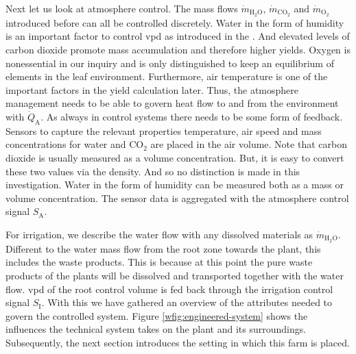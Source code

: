 Next let us look at atmosphere control.
The mass flows $\dot{m}_{\text{H}_2\text{O}}$, $\dot{m}_{\text{CO}_2}$ and $\dot{m}_{\text{O}_2}$ introduced before can all be controlled discretely.
Water in the form of humidity is an important factor to control \ac{vpd} as introduced in the .
And elevated levels of carbon dioxide promote mass accumulation and therefore higher yields.
Oxygen is nonessential in our inquiry and is only distinguished to keep an equilibrium of elements in the leaf environment.
Furthermore, air temperature is one of the important factors in the yield calculation later.
Thus, the atmosphere management needs to be able to govern heat flow to and from the environment with $\dot{Q}_\text{A}$.
As always in control systems there needs to be some form of feedback.
Sensors to capture the relevant properties temperature, air speed and mass concentrations for water and CO$_2$ are placed in the air volume.
Note that carbon dioxide is usually measured as a volume concentration.
But, it is easy to convert these two values via the density.
And so no distinction is made in this investigation.
Water in the form of humidity can be measured both as a mass or volume concentration.
The sensor data is aggregated with the atmosphere control signal $S_\text{A}$.

For irrigation, we describe the water flow with any dissolved materials as $\dot{m}_{\text{H}_2\text{O}}$.
Different to the water mass flow from the root zone towards the plant, this includes the waste products.
This is because at this point the pure waste products of the plants will be dissolved and transported together with the water flow.
\ac{vpd} of the root control volume is fed back through the irrigation control signal $S_\text{I}$.
With this we have gathered an overview of the attributes needed to govern the controlled system.
Figure \ref{wfig:engineered-system} shows the influences the technical system takes on the plant and its surroundings.
Subsequently, the next section introduces the setting in which this farm is placed.


